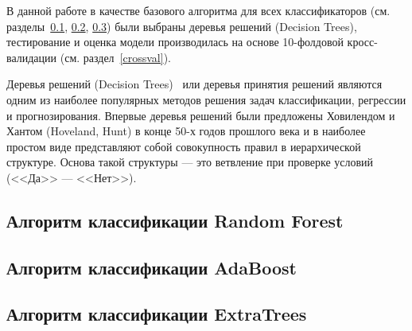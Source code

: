 В данной работе в качестве базового алгоритма для всех классификаторов (см. разделы~\ref{random_forest},
\ref{ada}, \ref{extra}) были выбраны деревья решений 
(Decision Trees), тестирование и оценка модели производилась на основе 10-фолдовой кросс-валидации 
(см. раздел~\ref{crossval}).

Деревья решений (Decision Trees)~\cite{data_mining} или деревья принятия решений являются одним из наиболее популярных
методов решения задач классификации, регрессии и прогнозирования. Впервые деревья решений были предложены Ховилендом и Хантом (Hoveland, Hunt) 
в конце 50-х годов прошлого века и в наиболее простом виде представляют собой совокупность правил в иерархической 
структуре. Основа такой структуры --- это ветвление при проверке условий (<<Да>> --- <<Нет>>). 



\subsection{Алгоритм классификации Random Forest}\label{random_forest}

 

\subsection{Алгоритм классификации AdaBoost}\label{ada}


\subsection{Алгоритм классификации ExtraTrees}\label{extra}
